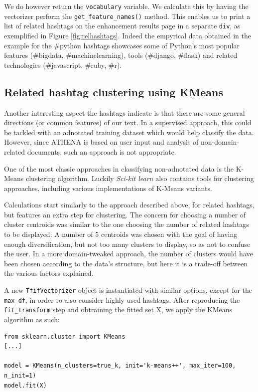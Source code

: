 We do however return the \texttt{vocabulary} variable. We calculate this by having the vectorizer perform the \texttt{get\_feature\_names()} method. This enables us to print a list of related hashtags on the enhancement results page in a separate \texttt{div}, as exemplified in Figure \ref{fig:relhashtags}. Indeed the empyrical data obtained in the example for the \#python hashtags showcases some of Python's most popular features (\#bigdata, \#machinelearning), tools (\#django, \#flask) and related technologies (\#javascript, \#ruby, \#r).

\subsection{Related hashtag clustering using KMeans}
Another interesting aspect the hashtags indicate is that there are some general directions (or common features) of our text. In a supervised approach, this could be tackled with an adnotated training dataset which would help classify the data. However, since ATHENA is based on user input and analysis of non-domain-related documents, such an approach is not appropriate.

One of the most classic approaches in classifying non-adnotated data is the K-Means clustering algorithm. Luckily \emph{Sci-kit learn} also contains tools for clustering approaches, including various implementations of K-Means variants.

Calculations start similarly to the approach described above, for related hashtags, but features an extra step for clustering. The concern for choosing a number of cluster centroids was similar to the one choosing the number of related hashtags to be displayed: A number of 5 centroids was chosen with the goal of having enough diversification, but not too many clusters to display, so as not to confuse the user. In a more domain-tweaked approach, the number of clusters would have been chosen according to the data's structure, but here it is a trade-off between the various factors explained.

A new \texttt{TfifVectorizer} object is instantiated with similar options, except for the \texttt{max\_df}, in order to also consider highly-used hashtags. After reproducing the \texttt{fit\_transform} step and obtraining the fitted set X, we apply the KMeans algorithm as such:

\lstset{basicstyle=\small, breaklines=True}
\begin{lstlisting}
from sklearn.cluster import KMeans
[...]

model = KMeans(n_clusters=true_k, init='k-means++', max_iter=100, n_init=1)
model.fit(X)
\end{lstlisting}

